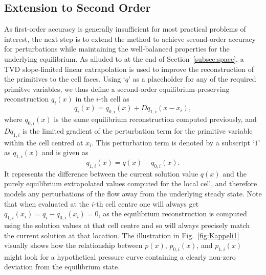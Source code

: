 \subsection{Extension to Second Order}
\label{subsec:secondOrder}

As first-order accuracy is generally insufficient for most practical problems of interest, the next step is to extend the method to achieve second-order accuracy for perturbations while maintaining the well-balanced properties for the underlying equilibrium. As alluded to at the end of Section~\ref{subsec:space}, a TVD slope-limited linear extrapolation is used to improve the reconstruction of the primitives to the cell faces. Using `$q$' as a placeholder for any of the required primitve variables, we thus define a second-order equilibrium-preserving reconstruction $q_i(x)$ in the $i\textrm{-th}$ cell as
\begin{equation}
q_i(x)=q_{0,i}(x)+Dq_{1,i}(x-x_i),
\end{equation}
where $q_{0,i}(x)$ is the same equilibrium reconstruction computed previously, and $Dq_{1,i}$ is the limited gradient of the perturbation term for the primitive variable within the cell centred at $x_i$. This perturbation term is denoted by a subscript `$1$' as $q_{1,i}(x)$ and is given as
\begin{equation}
q_{1,i}(x)=q(x)-q_{0,i}(x).
\end{equation}
It represents the difference between the current solution value $q(x)$ and the purely equilibrium extrapolated values computed for the local cell, and therefore models any perturbations of the flow away from the underlying steady state. Note that when evaluated at the $i\textrm{-th}$ cell centre one will always get $q_{1,i}(x_i)=q_i-q_{0,i}(x_i)=0$, as the equilibrium reconstruction is computed using the solution values at that cell centre and so will always precisely match the current solution at that location. The illustration in Fig.~\ref{fig:Kappeli1} visually shows how the relationship between $p(x)$, $p_{0,i}(x)$, and $p_{1,i}(x)$ might look for a hypothetical pressure curve containing a clearly non-zero deviation from the equilibrium state.
